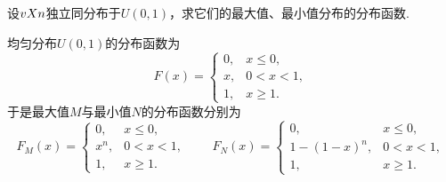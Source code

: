 \begin{example}
设\(v{X}{n}\)独立同分布于\(U(0,1)\)，求它们的最大值、最小值分布的分布函数.
\begin{solution}
均匀分布\(U(0,1)\)的分布函数为\[
F(x) = \left\{ \begin{array}{cc}
0, & x \leqslant 0, \\
x, & 0 < x < 1, \\
1, & x \geqslant 1.
\end{array} \right.
\]于是最大值\(M\)与最小值\(N\)的分布函数分别为\[
F_M(x) = \left\{ \begin{array}{cc}
0, & x \leqslant 0, \\
x^n, & 0 < x < 1, \\
1, & x \geqslant 1.
\end{array} \right.
\qquad
F_N(x) = \left\{ \begin{array}{cc}
0, & x \leqslant 0, \\
1-(1-x)^n, & 0 < x < 1, \\
1, & x \geqslant 1.
\end{array} \right.
\]
\end{solution}
\end{example}

